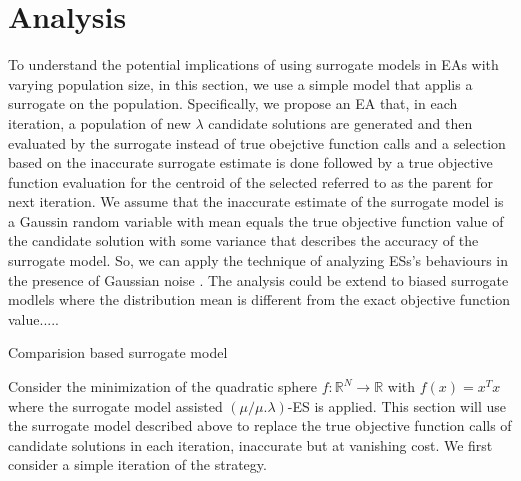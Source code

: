 \section{Analysis}


To understand the potential implications of using surrogate models in EAs with varying population size, in this section, we use a simple model that applis a surrogate on the population. Specifically, we propose an EA that, in each iteration, a population of new $\lambda$ candidate solutions are generated and then evaluated by the surrogate instead of true obejctive function calls and a selection based on the inaccurate surrogate estimate is done followed by a true objective function evaluation for the centroid of the selected referred to as the parent for next iteration. We assume that the inaccurate estimate of the surrogate model is a Gaussin random variable with mean equals the true objective function value of the candidate solution with some variance that describes the accuracy of the surrogate model. So, we can apply the technique of analyzing ESs's behaviours in the presence of Gaussian noise \cite{arnold2002noisy}. The analysis could be extend to biased surrogate modlels  where the distribution mean is different from the exact objective function value\cite{DBLP:conf/ppsn/KayhaniA18}.....


Comparision based surrogate model 


Consider the minimization of the quadratic sphere $f: \mathbb R^N \rightarrow \mathbb R$ with $f(x)=x^Tx$ where the surrogate model assisted $(\mu/\mu.\lambda)$-ES is applied. This section will use the surrogate model described above to replace the true objective function calls of candidate solutions in each iteration, inaccurate but at vanishing cost. We first consider a simple iteration of the strategy. 


